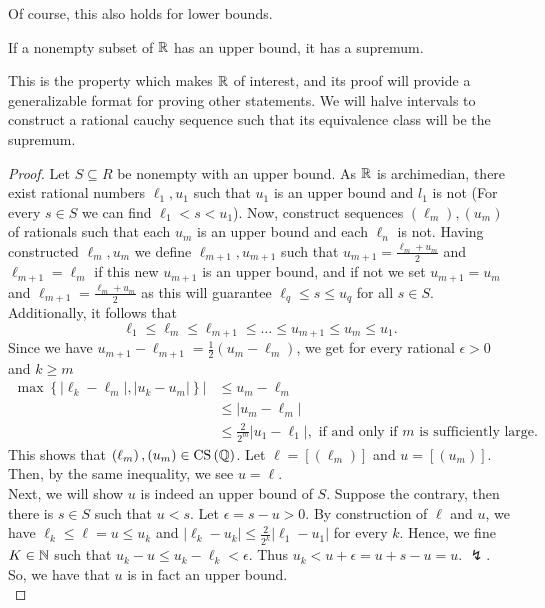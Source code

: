 Of course, this also holds for lower bounds.
\begin{theorem}
	If a nonempty subset of \(\mathbb{R}\) has an upper bound, it has a supremum.
\end{theorem}
This is the property which makes \(\mathbb{R}\) of interest, and its proof will provide a generalizable format for proving other statements. We will halve intervals to construct a rational cauchy sequence such that its equivalence class will be the supremum.
\begin{proof}
	Let \(S \subseteq R\) be nonempty with an upper bound. As \(\mathbb{R} \) is archimedian, there exist rational numbers \(\ell_1, u_1\) such that \(u_1\) is an upper bound and \(l_1\) is not (For every \( s \in S\) we can find \(\ell_1 < s < u_1\)). Now, construct sequences \(\left( \ell_m \right), \left( u_{m} \right)  \)of rationals such that each \(u_{m}\) is an upper bound and each \(\ell_n\) is not. Having constructed \( \ell_{m}, u_{m}\) we define \(\ell_{m+1}, u_{m+1}\) such that \(u_{m+1} = \frac{\ell_{m} + u_{m}}{2}\) and \(\ell_{m+1}= \ell_{m}\) if this new \(u_{m+1}\) is an upper bound, and if not we set \(u_{m+1} = u_{m}\) and \(\ell_{m+1} = \frac{\ell_{m} + u_{m}}{2}\) as this will guarantee \(\ell_{q} \le s \le u_{q}\) for all \(s \in S\). Additionally, it follows that \[
	\ell_1 \le \ell_{m} \le \ell_{m+1}\le \ldots \le u_{m+1} \le u_{m} \le u_1
	.\]
	Since we have \(u_{m+1} - \ell_{m+1} = \frac{1}{2} \left( u_{m}  - \ell_{m}\right) \), we get for every rational \(\epsilon > 0\) and \(k \ge m\)
	\begin{align*}
		\max\left\{\left| \ell_{k} - \ell_{m}|, \left| u_{k} - u_{m} \right|\right\} \right| &\le  u_{m} - \ell_{m} \\
												     &\le \left| u_{m} - \ell_{m} \right| \\
												     &\le \frac{2}{2^{m}}\left| u_1  - \ell_1\right| , \text{ if and only if \(m\) is sufficiently large}
	.\end{align*}
	This shows that \(\left( \ell_{m} \right), \left( u_{m} \right) \in \operatorname{CS} \left( \mathbb{Q} \right)  \). Let \(\ell = \left[ \left( \ell_{m} \right)  \right] \) and \(u	= \left[ \left( u_{m} \right)  \right] \). Then, by the same inequality, we see \(u = \ell\).\\
	Next, we will show \(u\) is indeed an upper bound of \(S\). Suppose the contrary, then there is \(s \in S\) such that \(u < s\). Let \(\epsilon = s- u > 0\). By construction of \(\ell\) and \(u\), we have \(\ell_{k} \le \ell = u \le u_{k}\) and \(\left| \ell_{k} - u_{k} \right| \le \frac{2}{2^{k}}\left| \ell_1 - u_1	  \right| \) for every \(k\). Hence, we fine \(K \in \mathbb{N}\) such that \(u_{k} - u \le u_{k} - \ell_{k} < \epsilon\). Thus \(u_{k} < u + \epsilon = u + s - u = u\). \(\lightning\). So, we have that \(u\) is in fact an upper bound.\\

\end{proof}
